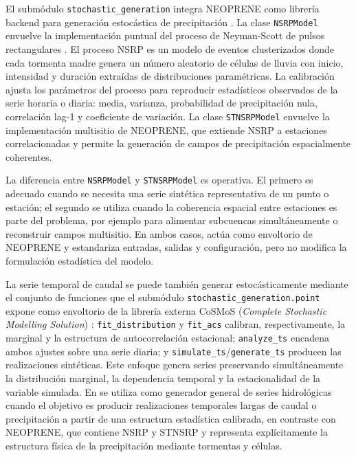 El submódulo \texttt{stochastic\_generation} integra NEOPRENE como librería backend para generación estocástica de precipitación \parencite{diezsierra2023neoprene}. La clase \texttt{NSRPModel} envuelve la implementación puntual del proceso de Neyman-Scott de pulsos rectangulares \parencite{rodriguezituribe1987,rodriguezituribe1988}. El proceso NSRP es un modelo de eventos clusterizados donde cada tormenta madre genera un número aleatorio de células de lluvia con inicio, intensidad y duración extraídas de distribuciones paramétricas. La calibración ajusta los parámetros del proceso para reproducir estadísticos observados de la serie horaria o diaria: media, varianza, probabilidad de precipitación nula, correlación lag-1 y coeficiente de variación. La clase \texttt{STNSRPModel} envuelve la implementación multisitio de NEOPRENE, que extiende NSRP a estaciones correlacionadas y permite la generación de campos de precipitación espacialmente coherentes.

La diferencia entre \texttt{NSRPModel} y \texttt{STNSRPModel} es operativa. El primero es adecuado cuando se necesita una serie sintética representativa de un punto o estación; el segundo se utiliza cuando la coherencia espacial entre estaciones es parte del problema, por ejemplo para alimentar subcuencas simultáneamente o reconstruir campos multisitio. En ambos casos, \pyhydra actúa como envoltorio de NEOPRENE y estandariza entradas, salidas y configuración, pero no modifica la formulación estadística del modelo.

La serie temporal de caudal se puede también generar estocásticamente mediante el conjunto de funciones que el submódulo \texttt{stochastic\_generation.point} expone como envoltorio de la librería externa CoSMoS (\emph{Complete Stochastic Modelling Solution}) \parencite{papalexiou2018storm}: \texttt{fit\_distribution} y \texttt{fit\_acs} calibran, respectivamente, la marginal y la estructura de autocorrelación estacional; \texttt{analyze\_ts} encadena ambos ajustes sobre una serie diaria; y \texttt{simulate\_ts}/\texttt{generate\_ts} producen las realizaciones sintéticas. Este enfoque genera series preservando simultáneamente la distribución marginal, la dependencia temporal y la estacionalidad de la variable simulada. En \pyhydra se utiliza como generador general de series hidrológicas cuando el objetivo es producir realizaciones temporales largas de caudal o precipitación a partir de una estructura estadística calibrada, en contraste con NEOPRENE, que contiene NSRP y STNSRP y representa explícitamente la estructura física de la precipitación mediante tormentas y células.


